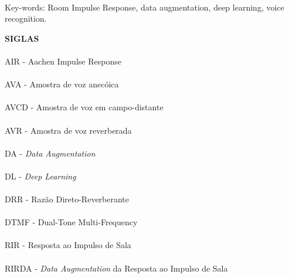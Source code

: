 \paragraph{}
\noindent Key-words: Room Impulse Response, data augmentation, deep learning, voice recognition.

\pagebreak


\begin{center}
\textbf{SIGLAS}
\end{center}
      \vspace{0.5cm}

\paragraph{}AIR - Aachen Impulse Response
\paragraph{}AVA - Amostra de voz anecóica
\paragraph{}AVCD - Amostra de voz em campo-distante
\paragraph{}AVR - Amostra de voz reverberada
\paragraph{}DA - \textit{Data Augmentation}
\paragraph{}DL - \textit{Deep Learning}
\paragraph{}DRR - Razão Direto-Reverberante
\paragraph{}DTMF - Dual-Tone Multi-Frequency
\paragraph{}RIR - Resposta ao Impulso de Sala
\paragraph{}RIRDA - \textit{Data Augmentation} da Resposta ao Impulso de Sala

